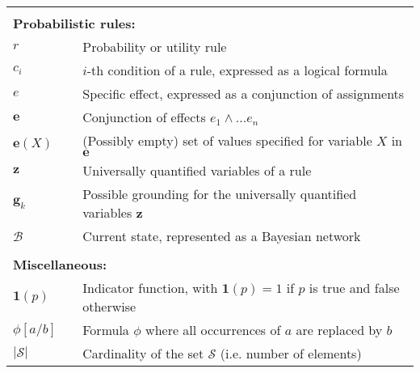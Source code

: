 \begin{longtable}{lp{5mm}p{11cm}}
&&  \vspace{3mm} \\
\multicolumn{3}{l}{\textbf{Probabilistic rules:}} \vspace{2mm} \\
$r$ && Probability or utility rule \\
$c_i$ && $i$-th condition of a rule, expressed as a logical formula \\
$e$ && Specific effect, expressed as a conjunction of assignments \\
$\mathbf{e}$ && Conjunction of effects $e_1 \land ... e_n$ \\
$\mathbf{e}(X)$ && (Possibly empty) set of values specified for variable $X$ in $\mathbf{e}$ \\
$\mathbf{z}$ && Universally quantified variables of a rule  \\
$\mathbf{g}_k$ && Possible grounding for the universally quantified variables $\mathbf{z}$ \\
$\mathcal{B}$ && Current state, represented as a Bayesian network \\
&&  \vspace{3mm} \\
\multicolumn{3}{l}{\textbf{Miscellaneous:}} \vspace{2mm} \\
$\mathbf{1}(p)$ && Indicator function, with $\mathbf{1}(p) = 1$ if $p$ is true and false otherwise \\
$\phi[a / b]$ && Formula $\phi$ where all occurrences of $a$ are replaced by $b$ \\
$|\mathcal{S}|$ && Cardinality of the set $\mathcal{S}$ (i.e. number of elements) 
\end{longtable}

